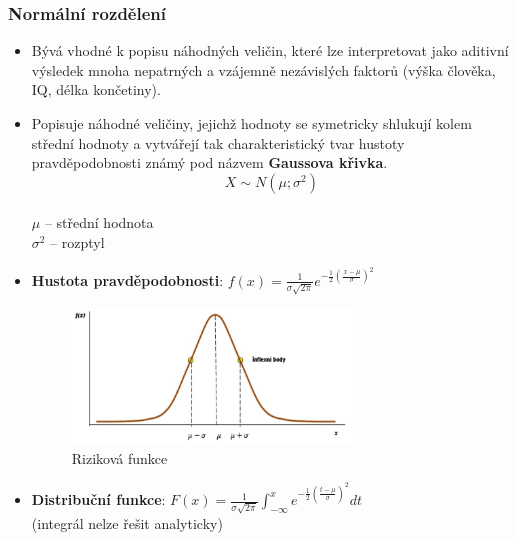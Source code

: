 \subsubsection{Normální rozdělení}
\begin{itemize}
	\item Bývá vhodné k popisu náhodných veličin, které lze interpretovat jako aditivní výsledek mnoha nepatrných a vzájemně nezávislých faktorů (výška člověka, IQ, délka končetiny).
	\item Popisuje náhodné veličiny, jejichž hodnoty se symetricky shlukují kolem střední hodnoty a vytvářejí tak charakteristický tvar hustoty pravděpodobnosti známý pod názvem \textbf{Gaussova křivka}. $$X \sim N (\mu;\sigma^2)$$  \\$\mu$ -- střední hodnota \\ $\sigma^2$ -- rozptyl
	\item \textbf{Hustota pravděpodobnosti}: $f(x) = \frac{1}{\sigma \sqrt{2\pi}} e^{-\frac{1}{2}({\frac{x - \mu}{\sigma}})^2}$
	\begin{figure}[H]
	\centering
	\includegraphics[width=0.7\textwidth]{assets/12_norm_roz}
	\caption{Riziková funkce}
	\end{figure}
	\item \textbf{Distribuční funkce}: $F(x) = \frac{1}{\sigma \sqrt{2\pi}} \int_{-\infty}^{x} e^{-\frac{1}{2}(\frac{t - \mu}{\sigma})^2} dt$\\ (integrál nelze řešit analyticky)
\end{itemize}


